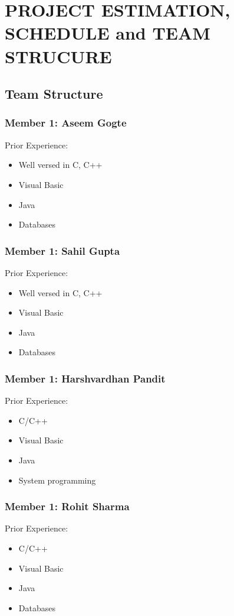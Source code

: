 \chapter{PROJECT ESTIMATION, SCHEDULE and TEAM STRUCURE}
\section{Team Structure}
\subsection{Member 1: Aseem Gogte}
Prior Experience:
\begin{itemize}
\item Well versed in C, C++
\item Visual Basic
\item Java
\item Databases
\end{itemize}

\subsection{Member 1: Sahil Gupta}
Prior Experience:
\begin{itemize}
\item Well versed in C, C++
\item Visual Basic
\item Java
\item Databases
\end{itemize}

\subsection{Member 1: Harshvardhan Pandit}
Prior Experience:
\begin{itemize}
\item C/C++
\item Visual Basic
\item Java
\item System programming
\end{itemize}

\subsection{Member 1: Rohit Sharma}
Prior Experience:
\begin{itemize}
\item C/C++
\item Visual Basic
\item Java
\item Databases
\end{itemize}

